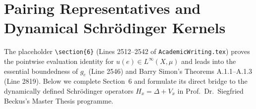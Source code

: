 \section{Pairing Representatives and Dynamical Schr\"odinger Kernels}
\label{sec:completion_section_6}

The placeholder \texttt{\textbackslash section\{6\}} (Lines 2512--2542 of \texttt{AcademicWriting.tex}) proves the pointwise evaluation identity for $u(e) \in L^\infty(X, \mu)$ and leads into the essential boundedness of $g_e$ (Line 2546) and Barry Simon's Theorems A.1.1--A.1.3 (Line 2819). Below we complete Section~6 and formulate its direct bridge to the dynamically defined Schr\"odinger operators $H_x = \Delta + V_x$ in Prof.\ Dr.\ Siegfried Beckus's Master Thesis programme.

